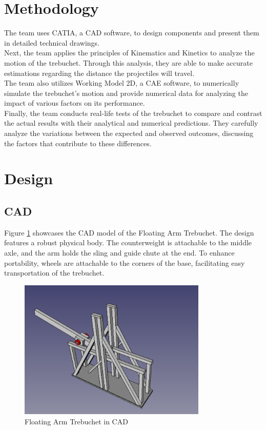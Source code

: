 \documentclass[12pt, titlepage]{article}
\begin{document}
    \section{Methodology}
    The team uses CATIA, a CAD software, to design components and present
    them in detailed technical drawings.\\[10pt] 
    Next, the team applies the principles of Kinematics and Kinetics to analyze the motion of the trebuchet. 
    Through this analysis, they are able to make accurate estimations regarding the distance the projectiles will travel.\\[10pt]
    The team also utilizes Working Model 2D, a CAE software, to numerically simulate the trebuchet's motion and provide numerical data for analyzing the impact of various factors on its performance.\\[10pt]
    Finally, the team conducts real-life tests of the trebuchet to compare and contrast the actual results with their analytical and numerical predictions. They carefully analyze the variations between the expected and observed outcomes, discussing the factors that contribute to these differences.    
    \newpage
    \section{Design}
    \subsection{CAD}
    Figure \ref{CAD} showcases the CAD model of the Floating Arm Trebuchet. The design features a robust physical body. The counterweight is attachable to the middle axle, and the arm holds the sling and guide chute at the end. To enhance portability, wheels are attachable to the corners of the base, facilitating easy transportation of the trebuchet.\\
    \begin{figure}[t]                                  
    \centering
    \includegraphics[width=0.8\textwidth]{CAD.png}
    \caption{Floating Arm Trebuchet in CAD\label{CAD}}
    \end{figure}
    \newpage
\end{document}
